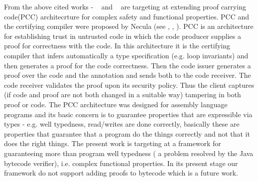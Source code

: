 From the above cited works - ~\cite{WildmoserN-ESOP05} and ~\cite{BM05plb} are targeting at extending proof carrying code(PCC) architecrture for complex safety and functional properties. PCC and the certifying compiler were proposed by Necula (see \cite{Necula97}, \cite{ComNec}, \cite{DesNecLee98}). PCC is an architecture for establishing trust in untrusted code in which the code producer supplies a proof for correctness with the code. In this architecture it is the certifying compiler that infers automatically a type specification (e.g. loop invariants) and then generates a proof for the code correctness. Then the code issuer generates a proof over the code and the annotation and sends both to the code receiver. The code receiver validates the proof upon its security policy. Thus the client captures (if code and proof are not both changed in a suitable way) tampering in both proof or code. The PCC architecture was designed for assembly language programs and its basic concern is to guarantee properties that are expressible via types - e.g. well typedness, read/writes are done correctly, basically these are properties that guarantee that a program do the things correctly and not that it does the right things. The present work is targeting at a framework for guaranteeing more than program well typedness ( a problem resolved by the Java bytecode verifier), i.e. complex functional properties. In its present stage our framework do not support adding proofs to bytecode which is a future work. 
